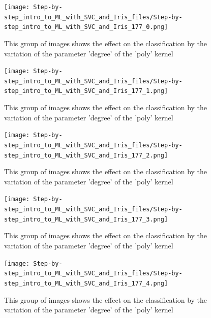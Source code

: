 \documentclass [oneside,10pt,a4paper,ngerman,BCOR10mm,headsepline,parindent,final]{scrartcl}
\begin{document}
    \begin{figure}
        \begin{center}\texttt{[image: Step-by-step\_intro\_to\_ML\_with\_SVC\_and\_Iris\_files/Step-by-step\_intro\_to\_ML\_with\_SVC\_and\_Iris\_177\_0.png]}\end{center}
        \caption{This group of images shows the effect on the classification by the variation of the parameter 'degree' of the 'poly' kernel}
        \label{fig:vary_degree_parameter}
    \end{figure}
    
    \begin{figure}
        \begin{center}\texttt{[image: Step-by-step\_intro\_to\_ML\_with\_SVC\_and\_Iris\_files/Step-by-step\_intro\_to\_ML\_with\_SVC\_and\_Iris\_177\_1.png]}\end{center}
        \caption{This group of images shows the effect on the classification by the variation of the parameter 'degree' of the 'poly' kernel}
        \label{fig:vary_degree_parameter}
    \end{figure}
    
    \begin{figure}
        \begin{center}\texttt{[image: Step-by-step\_intro\_to\_ML\_with\_SVC\_and\_Iris\_files/Step-by-step\_intro\_to\_ML\_with\_SVC\_and\_Iris\_177\_2.png]}\end{center}
        \caption{This group of images shows the effect on the classification by the variation of the parameter 'degree' of the 'poly' kernel}
        \label{fig:vary_degree_parameter}
    \end{figure}
    
    \begin{figure}
        \begin{center}\texttt{[image: Step-by-step\_intro\_to\_ML\_with\_SVC\_and\_Iris\_files/Step-by-step\_intro\_to\_ML\_with\_SVC\_and\_Iris\_177\_3.png]}\end{center}
        \caption{This group of images shows the effect on the classification by the variation of the parameter 'degree' of the 'poly' kernel}
        \label{fig:vary_degree_parameter}
    \end{figure}
    
    \begin{figure}
        \begin{center}\texttt{[image: Step-by-step\_intro\_to\_ML\_with\_SVC\_and\_Iris\_files/Step-by-step\_intro\_to\_ML\_with\_SVC\_and\_Iris\_177\_4.png]}\end{center}
        \caption{This group of images shows the effect on the classification by the variation of the parameter 'degree' of the 'poly' kernel}
        \label{fig:vary_degree_parameter}
    \end{figure}
    
\end{document}
